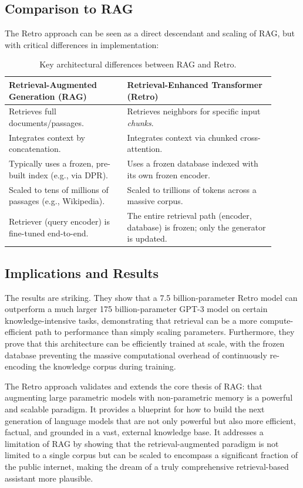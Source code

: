 \documentclass[a4paper,12pt]{article}
\begin{document}
\subsection{Comparison to RAG}

The Retro approach can be seen as a direct descendant and scaling of RAG, but with critical differences in implementation:

\begin{table}[h]
\centering
\begin{tabular}{p{0.4\linewidth}p{0.5\linewidth}}
\hline
\textbf{Retrieval-Augmented Generation (RAG)} & \textbf{Retrieval-Enhanced Transformer (Retro)} \\
\hline
Retrieves full documents/passages. & Retrieves neighbors for specific input \textit{chunks}. \\
Integrates context by concatenation. & Integrates context via chunked cross-attention. \\
Typically uses a frozen, pre-built index (e.g., via DPR). & Uses a frozen database indexed with its own frozen encoder. \\
Scaled to tens of millions of passages (e.g., Wikipedia). & Scaled to trillions of tokens across a massive corpus. \\
Retriever (query encoder) is fine-tuned end-to-end. & The entire retrieval path (encoder, database) is frozen; only the generator is updated. \\
\hline
\end{tabular}
\caption{\label{tab:rag-vs-retro}Key architectural differences between RAG and Retro.}
\end{table}

\subsection{Implications and Results}

The results are striking. They show that a 7.5 billion-parameter Retro model can outperform a much larger 175 billion-parameter GPT-3 model on certain knowledge-intensive tasks, demonstrating that retrieval can be a more compute-efficient path to performance than simply scaling parameters. Furthermore, they prove that this architecture can be efficiently trained at scale, with the frozen database preventing the massive computational overhead of continuously re-encoding the knowledge corpus during training.

The Retro approach validates and extends the core thesis of RAG: that augmenting large parametric models with non-parametric memory is a powerful and scalable paradigm. It provides a blueprint for how to build the next generation of language models that are not only powerful but also more efficient, factual, and grounded in a vast, external knowledge base. It addresses a limitation of RAG by showing that the retrieval-augmented paradigm is not limited to a single corpus but can be scaled to encompass a significant fraction of the public internet, making the dream of a truly comprehensive retrieval-based assistant more plausible.
\end{document}
